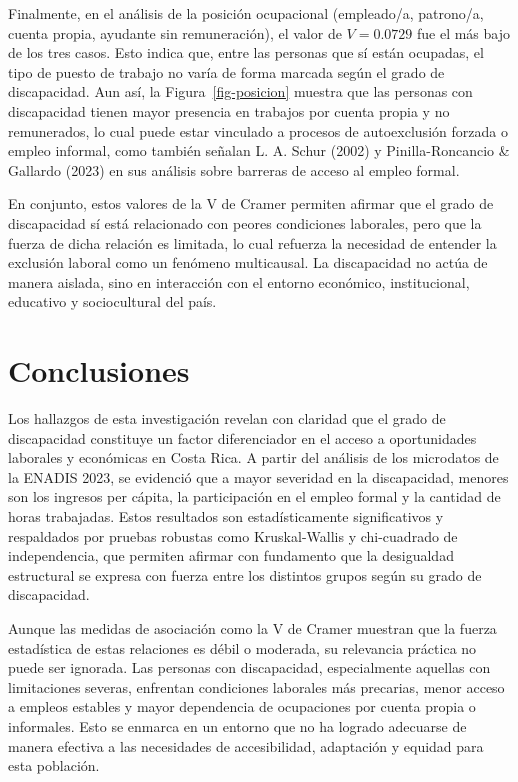 \documentclass[
  11pt,
  oneside]{article}
\begin{document}
Finalmente, en el análisis de la posición ocupacional (empleado/a,
patrono/a, cuenta propia, ayudante sin remuneración), el valor de
\(V = 0.0729\) fue el más bajo de los tres casos. Esto indica que, entre
las personas que sí están ocupadas, el tipo de puesto de trabajo no
varía de forma marcada según el grado de discapacidad. Aun así, la
Figura~\ref{fig-posicion} muestra que las personas con discapacidad
tienen mayor presencia en trabajos por cuenta propia y no remunerados,
lo cual puede estar vinculado a procesos de autoexclusión forzada o
empleo informal, como también señalan L. A. Schur (2002) y
Pinilla-Roncancio \& Gallardo (2023) en sus análisis sobre barreras de
acceso al empleo formal.

En conjunto, estos valores de la V de Cramer permiten afirmar que el
grado de discapacidad sí está relacionado con peores condiciones
laborales, pero que la fuerza de dicha relación es limitada, lo cual
refuerza la necesidad de entender la exclusión laboral como un fenómeno
multicausal. La discapacidad no actúa de manera aislada, sino en
interacción con el entorno económico, institucional, educativo y
sociocultural del país.

\section{Conclusiones}\label{conclusiones}

Los hallazgos de esta investigación revelan con claridad que el grado de
discapacidad constituye un factor diferenciador en el acceso a
oportunidades laborales y económicas en Costa Rica. A partir del
análisis de los microdatos de la ENADIS 2023, se evidenció que a mayor
severidad en la discapacidad, menores son los ingresos per cápita, la
participación en el empleo formal y la cantidad de horas trabajadas.
Estos resultados son estadísticamente significativos y respaldados por
pruebas robustas como Kruskal-Wallis y chi-cuadrado de independencia,
que permiten afirmar con fundamento que la desigualdad estructural se
expresa con fuerza entre los distintos grupos según su grado de
discapacidad.

Aunque las medidas de asociación como la V de Cramer muestran que la
fuerza estadística de estas relaciones es débil o moderada, su
relevancia práctica no puede ser ignorada. Las personas con
discapacidad, especialmente aquellas con limitaciones severas, enfrentan
condiciones laborales más precarias, menor acceso a empleos estables y
mayor dependencia de ocupaciones por cuenta propia o informales. Esto se
enmarca en un entorno que no ha logrado adecuarse de manera efectiva a
las necesidades de accesibilidad, adaptación y equidad para esta
población.
\end{document}
